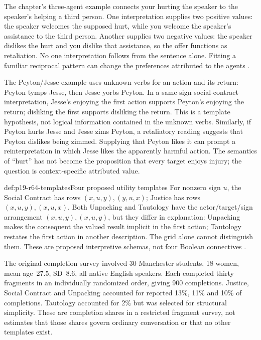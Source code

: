 The chapter's three-agent example connects your hurting the speaker to the
speaker's helping a third person. One interpretation supplies two positive
values: the speaker welcomes the supposed hurt, while you welcome the
speaker's assistance to the third person. Another supplies two negative
values: the speaker dislikes the hurt and you dislike that assistance, so
the offer functions as retaliation. No one interpretation follows from the
sentence alone. Fitting a familiar reciprocal pattern can change the
preferences attributed to the agents \cite[p.~422]{Bonnefon2021Utility}.

The Peyton/Jesse example uses unknown verbs for an action and its return:
Peyton tymps Jesse, then Jesse yorbs Peyton. In a same-sign social-contract
interpretation, Jesse's enjoying the first action supports Peyton's enjoying
the return; disliking the first supports disliking the return. This is a
template hypothesis, not logical information contained in the unknown verbs.
Similarly, if Peyton hurts Jesse and Jesse zims Peyton, a retaliatory reading
suggests that Peyton dislikes being zimmed. Supplying that Peyton likes it
can prompt a reinterpretation in which Jesse likes the apparently harmful
action. The semantics of ``hurt'' has not become the proposition that every
target enjoys injury; the question is context-specific attributed value.

\begin{hbdefinition}{def:p19-r64-templates}{Four proposed utility templates}
For nonzero sign \(u\), the Social Contract has rows
\((x,u,y),(y,u,x)\); Justice has rows \((x,u,y),(x,u,x)\).
Both Unpacking and Tautology have the actor/target/sign arrangement
\((x,u,y),(x,u,y)\), but they differ in explanation: Unpacking makes
the consequent the valued result implicit in the first action; Tautology
restates the first action in another description. The grid alone cannot
distinguish them. These are proposed interpretive schemas, not four
Boolean connectives \cite[pp.~351--354]{BonnefonHaighStewart2013Templates}.
\end{hbdefinition}

The original completion survey involved 30 Manchester students, 18 women,
mean age~27.5, SD~8.6, all native English speakers. Each completed thirty
fragments in an individually randomized order, giving 900 completions.
Justice, Social Contract and Unpacking accounted for reported 13\%, 11\%
and 10\% of completions. Tautology accounted for 2\% but was selected
for structural simplicity. These are completion shares in a restricted
fragment survey, not estimates that those shares govern ordinary conversation
or that no other templates exist.

